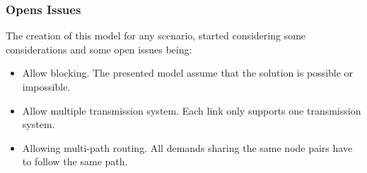 \vspace{13pt}

\subsubsection{Opens Issues}

The creation of this model for any scenario, started considering some considerations and some open issues being:

\begin{itemize}
  \item Allow blocking.
  \subitem The presented model assume that the solution is possible or impossible.
  \item Allow multiple transmission system.
  \subitem Each link only supports one transmission system.
  \item Allowing multi-path routing.
  \subitem All demands sharing the same node pairs have to follow the same path.
\end{itemize}

